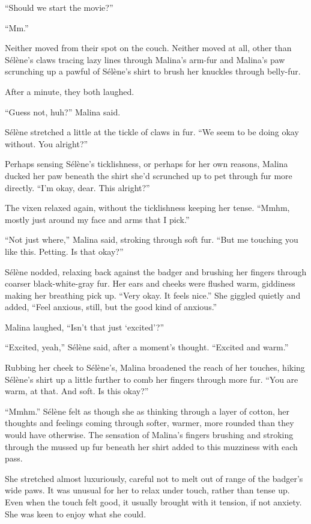 ``Should we start the movie?''

``Mm.''

Neither moved from their spot on the couch. Neither moved at all, other than Sélène's claws tracing lazy lines through Malina's arm-fur and Malina's paw scrunching up a pawful of Sélène's shirt to brush her knuckles through belly-fur.

After a minute, they both laughed.

``Guess not, huh?'' Malina said.

Sélène stretched a little at the tickle of claws in fur. ``We seem to be doing okay without. You alright?''

Perhaps sensing Sélène's ticklishness, or perhaps for her own reasons, Malina ducked her paw beneath the shirt she'd scrunched up to pet through fur more directly. ``I'm okay, dear. This alright?''

The vixen relaxed again, without the ticklishness keeping her tense. ``Mmhm, mostly just around my face and arms that I pick.''

``Not just where,'' Malina said, stroking through soft fur. ``But me touching you like this. Petting. Is that okay?''

Sélène nodded, relaxing back against the badger and brushing her fingers through coarser black-white-gray fur. Her ears and cheeks were flushed warm, giddiness making her breathing pick up. ``Very okay. It feels nice.'' She giggled quietly and added, ``Feel anxious, still, but the good kind of anxious.''

Malina laughed, ``Isn't that just `excited'?''

``Excited, yeah,'' Sélène said, after a moment's thought. ``Excited and warm.''

Rubbing her cheek to Sélène's, Malina broadened the reach of her touches, hiking Sélène's shirt up a little further to comb her fingers through more fur. ``You are warm, at that. And soft. Is this okay?''

``Mmhm.'' Sélène felt as though she as thinking through a layer of cotton, her thoughts and feelings coming through softer, warmer, more rounded than they would have otherwise. The sensation of Malina's fingers brushing and stroking through the mussed up fur beneath her shirt added to this muzziness with each pass.

She stretched almost luxuriously, careful not to melt out of range of the badger's wide paws. It was unusual for her to relax under touch, rather than tense up. Even when the touch felt good, it usually brought with it tension, if not anxiety. She was keen to enjoy what she could.

